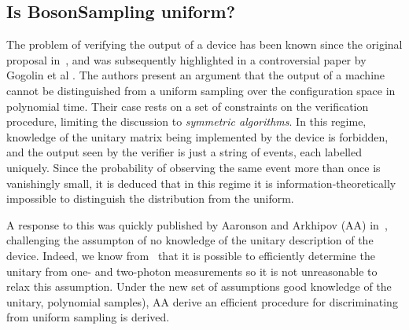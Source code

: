 \subsection{Is BosonSampling uniform?}
\label{sec:RStar}
The problem of verifying the output of a \bosonsampling{} device has been known
since the original proposal in~\cite{bosonsampling}, and was subsequently
highlighted in a controversial paper by Gogolin et al \cite{gogolin}. The
authors present an argument that the output of a \bosonsampling{} machine cannot
be distinguished from a uniform sampling over the configuration space in
polynomial time. Their case rests on a set of constraints on the verification
procedure, limiting the discussion to \emph{symmetric algorithms}. In this
regime, knowledge of the unitary matrix being implemented by the device is
forbidden, and the output seen by the verifier is just a string of events, each
labelled uniquely. Since the probability of observing the same event more than
once is vanishingly small, it is deduced that in this regime it is
information-theoretically impossible to distinguish the \bosonsampling{}
distribution from the uniform.

A response to this was quickly published by Aaronson and Arkhipov (AA)
in~\cite{notuniform}, challenging the assumpton of no knowledge of the unitary
description of the device. Indeed, we know from~\cite{sst} that it is possible
to efficiently determine the unitary from one- and two-photon measurements so it
is not unreasonable to relax this assumption. Under the new set of assumptions 
good knowledge of the unitary, polynomial samples), AA derive an efficient
procedure for discriminating \bosonsampling{} from uniform sampling is derived.

